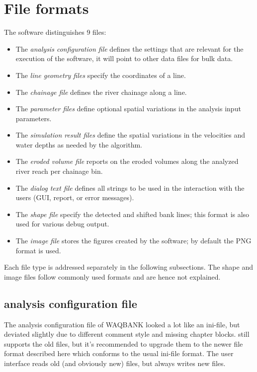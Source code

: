 \chapter{File formats} \label{Chp:FileFormats}

The software distinguishes 9 files:

\begin{itemize}
\item The \emph{analysis configuration file} defines the settings that are relevant for the execution of the software, it will point to other data files for bulk data.
\item The \emph{line geometry files} specify the coordinates of a line.
\item The \emph{chainage file} defines the river chainage along a line.
\item The \emph{parameter files} define optional spatial variations in the analysis input parameters.
\item The \emph{simulation result files} define the spatial variations in the velocities and water depths as needed by the algorithm.
\item The \emph{eroded volume file} reports on the eroded volumes along the analyzed river reach per chainage bin.
\item The \emph{dialog text file} defines all strings to be used in the interaction with the users (GUI, report, or error messages).
\item The \emph{shape file} specify the detected and shifted bank lines; this format is also used for various debug output.
\item The \emph{image file} stores the figures created by the software; by default the PNG format is used.
\end{itemize}

Each file type is addressed separately in the following subsections.
The shape and image files follow commonly used formats and are hence not explained.

\section{analysis configuration file} \label{Sec:cfg}

The analysis configuration file of WAQBANK looked a lot like an ini-file, but deviated slightly due to different comment style and missing chapter blocks.
\dfastbe still supports the old files, but it's recommended to upgrade them to the newer file format described here which conforms to the usual ini-file format.
The user interface reads old (and obviously new) files, but always writes new files.

